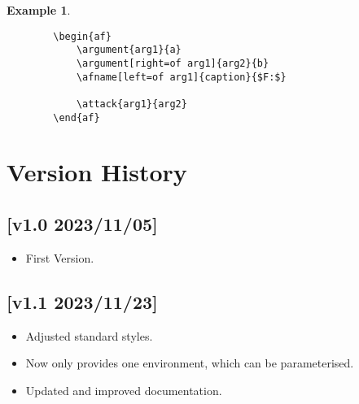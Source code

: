 \documentclass{article}
\newtheorem{example}{Example}
\begin{document}
    \begin{example}~
    \begin{verbatim}
        \begin{af}
            \argument{arg1}{a}
            \argument[right=of arg1]{arg2}{b}
            \afname[left=of arg1]{caption}{$F:$}
    
            \attack{arg1}{arg2}
        \end{af}    
    \end{verbatim}

    \begin{center}
        \begin{af}
    
        \end{af}    
    \end{center}
    \end{example}

\section{Version History}

\subsection*{[v1.0 2023/11/05]}
\begin{itemize}
    \item First Version.
\end{itemize}

\subsection*{[v1.1 2023/11/23]}
\begin{itemize}
    \item Adjusted standard styles.
    \item Now only provides one environment, which can be parameterised.
    \item Updated and improved documentation.
\end{itemize}
\end{document}
